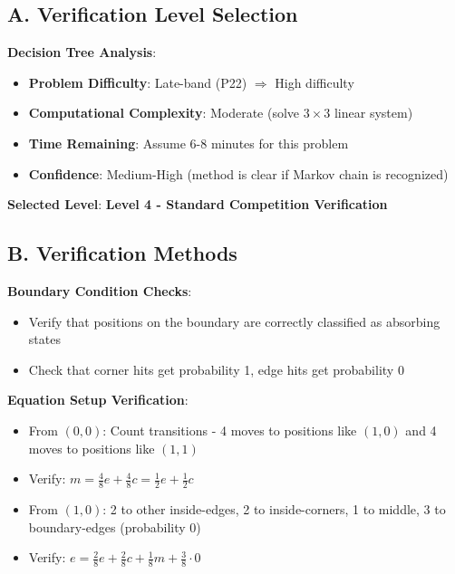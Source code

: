 \documentclass[12pt]{article}
\begin{document}
\begin{verificationbox}

\subsection*{A. Verification Level Selection}

\textbf{Decision Tree Analysis}:
\begin{itemize}[leftmargin=*]
    \item \textbf{Problem Difficulty}: Late-band (P22) $\Rightarrow$ High difficulty
    \item \textbf{Computational Complexity}: Moderate (solve $3 \times 3$ linear system)
    \item \textbf{Time Remaining}: Assume 6-8 minutes for this problem
    \item \textbf{Confidence}: Medium-High (method is clear if Markov chain is recognized)
\end{itemize}

\textbf{Selected Level}: \textbf{Level 4 - Standard Competition Verification}

\subsection*{B. Verification Methods}

\textbf{Boundary Condition Checks}:
\begin{itemize}[leftmargin=*]
    \item Verify that positions on the boundary are correctly classified as absorbing states
    \item Check that corner hits get probability 1, edge hits get probability 0
\end{itemize}

\textbf{Equation Setup Verification}:
\begin{itemize}[leftmargin=*]
    \item From $(0,0)$: Count transitions - 4 moves to positions like $(1,0)$ and 4 moves to positions like $(1,1)$
    \item Verify: $m = \frac{4}{8}e + \frac{4}{8}c = \frac{1}{2}e + \frac{1}{2}c$ \checkmark
    
    \item From $(1,0)$: 2 to other inside-edges, 2 to inside-corners, 1 to middle, 3 to boundary-edges (probability 0)
    \item Verify: $e = \frac{2}{8}e + \frac{2}{8}c + \frac{1}{8}m + \frac{3}{8} \cdot 0$ \checkmark
    

\end{itemize}
\end{verificationbox}
\end{document}
